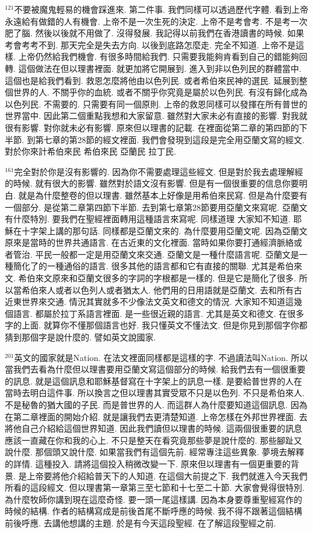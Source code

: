 \documentclass{book}
\begin{document}
$^{121}$不要被魔鬼輕易的機會踩進來.
第二件事.
我們同樣可以透過歷代字體.
看到上帝永遠給有做錯的人有機會.
上帝不是一次生死的決定.
上帝不是考會考.
不是考一次肥了腦.
然後以後就不用做了.
沒得發展.
我記得以前我們在香港讀書的時候.
如果考會考考不到.
那天完全是失去方向.
以後到底路怎麼走.
完全不知道.
上帝不是這樣.
上帝仍然給我們機會.
有很多時間給我們.
只需要我能夠肯看到自己的錯能夠回轉.
這個做法在但以理書裡面.
就更加將它開展到.
進入到非以色列民的群體當中.
這個也是給我們看到.
救恩怎麼將他由以色列民.
或者希伯來民神的選民.
延展到整個世界的人.
不關乎你的血統.
或者不關乎你究竟是屬於以色列民.
有沒有歸化成為以色列民.
不需要的.
只需要有同一個原則.
上帝的救恩同樣可以發揮在所有普世的世界當中.
因此第二個重點我想和大家留意.
雖然對大家未必有直接的影響.
對我就很有影響.
對你就未必有影響.
原來但以理書的記載.
在裡面從第二章的第四節的下半節.
到第七章的第28節的經文裡面.
我們會發現到這段是完全用亞蘭文寫的經文.
對於你來計希伯來民 希伯來民 亞蘭民 拉丁民.

$^{161}$完全對於你是沒有影響的.
因為你不需要處理這些經文.
但是對於我去處理解經的時候.
就有很大的影響.
雖然對於語文沒有影響.
但是有一個很重要的信息你要明白.
就是為什麼整卷的但以理書.
雖然基本上好像是用希伯來民寫.
但是為什麼要有一個部分.
是從第二章第四節下半節.
去到第七章第28節要用亞蘭文來寫呢.
亞蘭文有什麼特別.
要我們在聖經裡面轉用這種語言來寫呢.
同樣道理 大家知不知道.
耶穌在十字架上講的那句話.
同樣都是亞蘭文來的.
為什麼要用亞蘭文呢.
因為亞蘭文原來是當時的世界共通語言.
在古近東的文化裡面.
當時如果你要打通經濟脈絡或者管治.
平民一般都一定是用亞蘭文來交通.
亞蘭文是一種什麼語言呢.
亞蘭文是一種簡化了的一種通俗的語言.
很多其他的語言都和它有直接的關聯.
尤其是希伯來文.
希伯來文原來和亞蘭文很多的字詞的字根都是一樣的.
但是它是簡化了很多.
所以當希伯來人或者以色列人或者猶太人.
他們用的日用語就是亞蘭文.
去和所有古近東世界來交通.
情況其實就多不少像法文英文和德文的情況.
大家知不知道這幾個語言.
都屬於拉丁系語言裡面.
是一些很近親的語言.
尤其是英文和德文.
在很多字的上面.
就算你不懂那個語言也好.
我只懂英文不懂法文.
但是你見到那個字你都猜到那個字是說什麼的.
譬如英文說國家.

$^{201}$英文的國家就是Nation.
在法文裡面同樣都是這樣的字.
不過讀法叫Nation.
所以當我們去看為什麼但以理書要用亞蘭文寫這個部分的時候.
給我們去有一個很重要的訊息.
就是這個訊息和耶穌基督寫在十字架上的訊息一樣.
是要給普世界的人在當時去明白這件事.
所以換言之但以理書其實受眾不只是以色列.
不只是希伯來人.
不是秘魯的猶大國的子民.
而是普世界的人.
而這群人為什麼要知道這個訊息.
因為在第二章裡面的開始介紹.
就是讓我們去更清楚知道.
上帝怎樣在外邦世界裡面.
去將他自己介紹給這個世界知道.
因此我們讀但以理書的時候.
這兩個很重要的訊息應該一直藏在你和我的心上.
不只是整天在看究竟那些夢是說什麼的.
那些腳趾又說什麼.
那個頭又說什麼.
如果當我們有這個先前.
經常專注這些異象.
夢境去解釋的詳情.
這種投入.
請將這個投入稍微改變一下.
原來但以理書有一個更重要的背景.
是上帝要將他介紹給普天下的人知道.
在這個大前提之下.
我們就進入今天我們所看的這段經文.
但以理書第一章第三至七節和十七至二十節.
大家會覺得很特別.
為什麼牧師你講到現在這麼奇怪.
要一頭一尾這樣講.
因為本身要尊重聖經寫作的時候的結構.
作者的結構寫成是前後首尾不斷呼應的時候.
我不得不跟著這個結構前後呼應.
去講他想講的主題.
於是有今天這段聖經.
在了解這段聖經之前.
\end{document}
